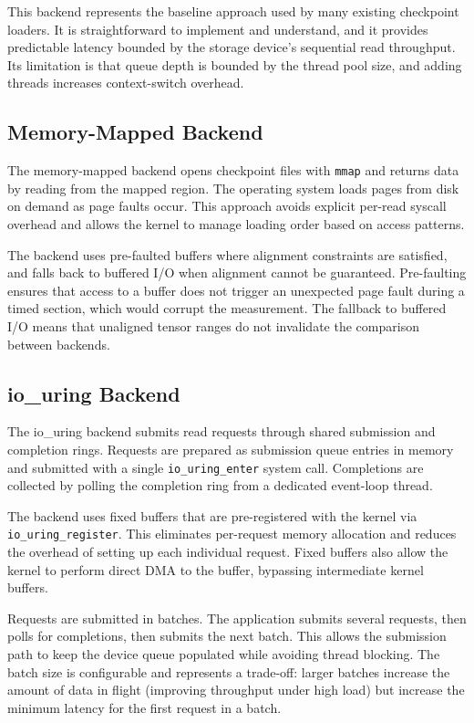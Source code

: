 This backend represents the baseline approach used by many existing checkpoint loaders. It is straightforward to implement and understand, and it provides predictable latency bounded by the storage device's sequential read throughput. Its limitation is that queue depth is bounded by the thread pool size, and adding threads increases context-switch overhead.

\subsection{Memory-Mapped Backend}

The memory-mapped backend opens checkpoint files with \texttt{mmap} and returns data by reading from the mapped region. The operating system loads pages from disk on demand as page faults occur. This approach avoids explicit per-read syscall overhead and allows the kernel to manage loading order based on access patterns.

The backend uses pre-faulted buffers where alignment constraints are satisfied, and falls back to buffered I/O when alignment cannot be guaranteed. Pre-faulting ensures that access to a buffer does not trigger an unexpected page fault during a timed section, which would corrupt the measurement. The fallback to buffered I/O means that unaligned tensor ranges do not invalidate the comparison between backends.

\subsection{io\_uring Backend}

The io\_uring backend submits read requests through shared submission and completion rings. Requests are prepared as submission queue entries in memory and submitted with a single \texttt{io\_uring\_enter} system call. Completions are collected by polling the completion ring from a dedicated event-loop thread.

The backend uses fixed buffers that are pre-registered with the kernel via \texttt{io\_uring\_register}. This eliminates per-request memory allocation and reduces the overhead of setting up each individual request. Fixed buffers also allow the kernel to perform direct DMA to the buffer, bypassing intermediate kernel buffers.

Requests are submitted in batches. The application submits several requests, then polls for completions, then submits the next batch. This allows the submission path to keep the device queue populated while avoiding thread blocking. The batch size is configurable and represents a trade-off: larger batches increase the amount of data in flight (improving throughput under high load) but increase the minimum latency for the first request in a batch.

